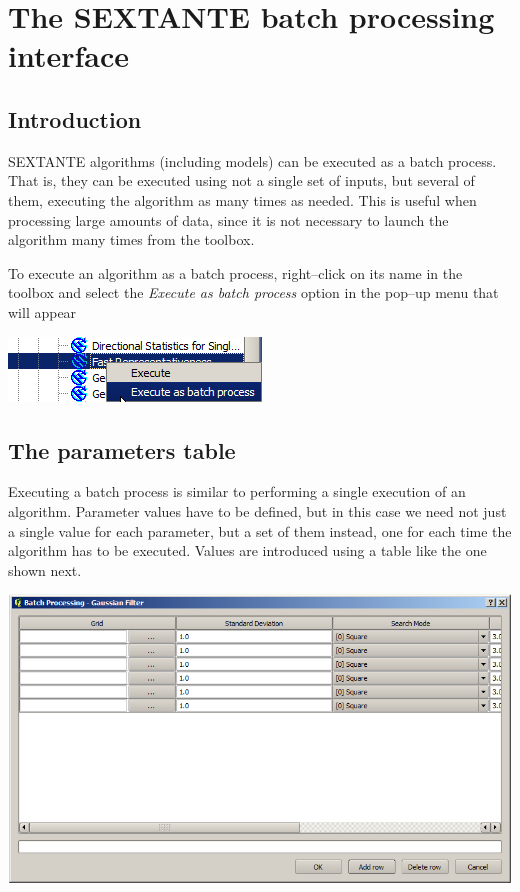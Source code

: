\chapter{The SEXTANTE batch processing interface}

\section{Introduction}

SEXTANTE algorithms (including models) can be executed as a batch process. That is, they can be executed using not a single set of inputs, but several of them, executing the algorithm as many times as needed. This is useful when processing large amounts of data, since it is not necessary to launch the algorithm many times from the toolbox.

To execute an algorithm as a batch process, right--click on its name in the toolbox and select the \emph{Execute as batch process} option in the pop--up menu that will appear

\begin{center}
\includegraphics[width=.5\columnwidth]{batch_processing_right_click.png}
\end{center}


\section{The parameters table}

Executing a batch process is similar to performing a single execution of an algorithm. Parameter values have to be defined, but in this case we need not just a single value for each parameter, but a set of them instead, one for each time the algorithm has to be executed. Values are introduced using a table like the one shown next.

\begin{center}
\includegraphics[width=.9\columnwidth]{batch_processing.png}
\end{center}

